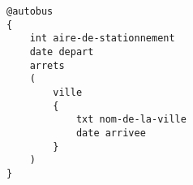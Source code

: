 \begin{lstlisting}
@autobus
{
    int aire-de-stationnement
    date depart
    arrets
    (
    	ville
    	{
    		txt nom-de-la-ville
    		date arrivee
    	}
    )
}
\end{lstlisting}
